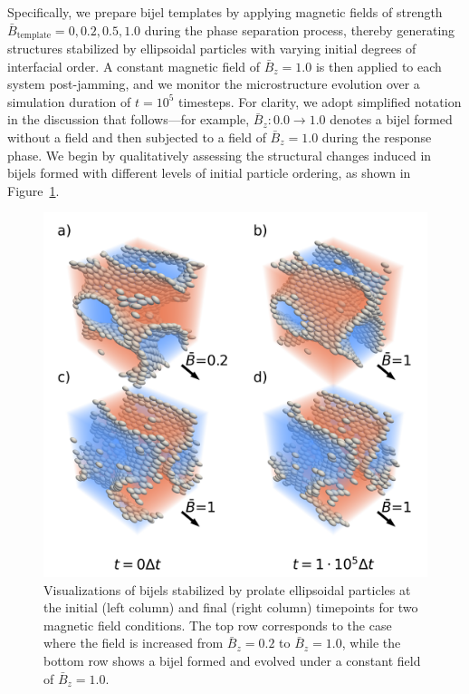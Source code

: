 Specifically, we prepare bijel templates by applying magnetic fields of strength \(\bar{B}_{\text{template}} = 0, 0.2, 0.5, 1.0\) during the phase separation 
process, thereby generating structures stabilized by ellipsoidal particles with varying initial degrees of interfacial order. A constant magnetic field of 
\(\bar{B}_z = 1.0\) is then applied to each system post-jamming, and we monitor the microstructure evolution over a simulation duration of \(t = 10^5\) 
timesteps. For clarity, we adopt simplified notation in the discussion that follows—for example, \(\bar{B}_z: 0.0 \rightarrow 1.0\) denotes a bijel 
formed without a field and then subjected to a field of \(\bar{B}_z = 1.0\) during the response phase. We begin by qualitatively assessing the 
structural changes induced in bijels formed with different levels of initial particle ordering, as shown in Figure~\ref{fig:microstructure_viz-field_up}.

\begin{figure}
\centering 
\includegraphics[scale=0.6]{../figures/results/paper2/microstructure_viz-field_up.png} 
\caption{Visualizations of bijels stabilized by prolate ellipsoidal particles at the initial (left column) and final (right column)
         timepoints for two magnetic field conditions. The top row corresponds to the case where the field is increased from 
         \(\bar{B}_z = 0.2\) to \(\bar{B}_z = 1.0\), while the bottom row shows a bijel formed and evolved under a constant field of 
         \(\bar{B}_z = 1.0\). }
\label{fig:microstructure_viz-field_up}
\end{figure}

